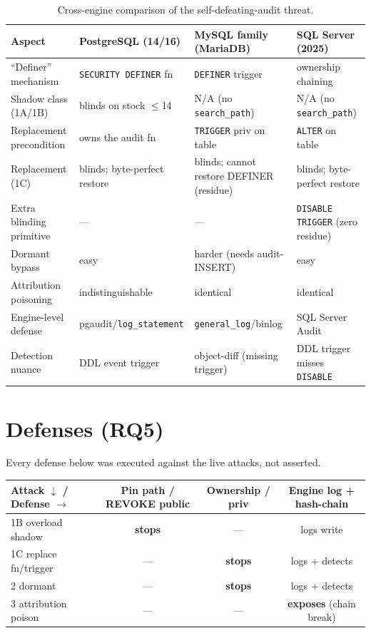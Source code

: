 \documentclass[11pt]{article}
\newcommand{\code}[1]{\texttt{#1}}
\begin{document}
\begin{table}[t]\centering\footnotesize
\caption{Cross-engine comparison of the self-defeating-audit threat.}
\label{tab:cross}
\begin{tabularx}{\textwidth}{@{}l Y Y Y@{}}
\toprule
Aspect & PostgreSQL (14/16) & MySQL family (MariaDB) & SQL Server (2025) \\
\midrule
``Definer'' mechanism & \code{SECURITY DEFINER} fn & \code{DEFINER} trigger & ownership chaining \\
Shadow class (1A/1B) & blinds on stock $\leq$14 & N/A (no \code{search\_path}) & N/A (no \code{search\_path}) \\
Replacement precondition & owns the audit fn & \code{TRIGGER} priv on table & \code{ALTER} on table \\
Replacement (1C) & blinds; byte-perfect restore & blinds; cannot restore DEFINER (residue) & blinds; byte-perfect restore \\
Extra blinding primitive & --- & --- & \code{DISABLE TRIGGER} (zero residue) \\
Dormant bypass & easy & harder (needs audit-INSERT) & easy \\
Attribution poisoning & indistinguishable & identical & identical \\
Engine-level defense & pgaudit/\code{log\_statement} & \code{general\_log}/binlog & SQL Server Audit \\
Detection nuance & DDL event trigger & object-diff (missing trigger) & DDL trigger misses \code{DISABLE} \\
\bottomrule
\end{tabularx}
\end{table}

\section{Defenses (RQ5)}
Every defense below was executed against the live attacks, not asserted.
\begin{table}[h]\centering\footnotesize
\begin{tabularx}{\columnwidth}{@{}Y c c c@{}}
\toprule
Attack $\downarrow$ / Defense $\rightarrow$ & Pin path / REVOKE public & Ownership / priv & Engine log + hash-chain \\
\midrule
1B overload shadow & \textbf{stops} & --- & logs write \\
1C replace fn/trigger & --- & \textbf{stops} & logs + detects \\
2 dormant & --- & \textbf{stops} & logs + detects \\
3 attribution poison & --- & --- & \textbf{exposes} (chain break) \\
\bottomrule
\end{tabularx}
\end{table}
\end{document}
